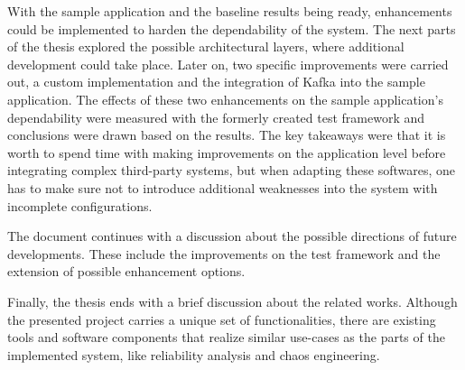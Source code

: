 With the sample application and the baseline results being ready, enhancements could be implemented to harden the dependability of the system. The next parts of the thesis explored the possible architectural layers, where additional development could take place. Later on, two specific improvements were carried out, a custom implementation and the integration of Kafka into the sample application. The effects of these two enhancements on the sample application's dependability were measured with the formerly created test framework and conclusions were drawn based on the results. The key takeaways were that it is worth to spend time with making improvements on the application level before integrating complex third-party systems, but when adapting these softwares, one has to make sure not to introduce additional weaknesses into the system with incomplete configurations.

The document continues with a discussion about the possible directions of future developments. These include the improvements on the test framework and the extension of possible enhancement options.

Finally, the thesis ends with a brief discussion about the related works. Although the presented project carries a unique set of functionalities, there are existing tools and software components that realize similar use-cases as the parts of the implemented system, like reliability analysis and chaos engineering.
